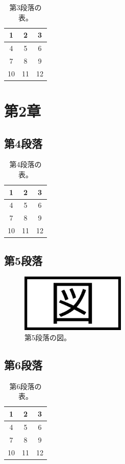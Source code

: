 \documentclass[a4paper, platex, dvipdfmx]{jsarticle}
\begin{document}
\begin{table}[H]
  \centering
  \caption{第3段落の表。}
  \begin{tabular}{ccc}
    \hline
    1 & 2 & 3 \\\hline
    4 & 5 & 6\\
    7 & 8 & 9 \\
    10 & 11 & 12 \\\hline
  \end{tabular}
\end{table}

\section{第2章}
\subsection{第4段落}
\lipsum[4]

\begin{table}[H]
  \centering
  \caption{第4段落の表。}
  \begin{tabular}{ccc}
    \hline
    1 & 2 & 3 \\\hline
    4 & 5 & 6\\
    7 & 8 & 9 \\
    10 & 11 & 12 \\\hline
  \end{tabular}
\end{table}

\subsection{第5段落}
\lipsum[5]

\begin{figure}[H]
  \centering
  \includegraphics[width=5cm]{sample.png}
  \caption{第5段落の図。}
\end{figure}

\subsection{第6段落}
\lipsum[6]

\begin{table}[H]
  \centering
  \caption{第6段落の表。}
  \begin{tabular}{ccc}
    \hline
    1 & 2 & 3 \\\hline
    4 & 5 & 6\\
    7 & 8 & 9 \\
    10 & 11 & 12 \\\hline
  \end{tabular}
\end{table}
\end{document}
